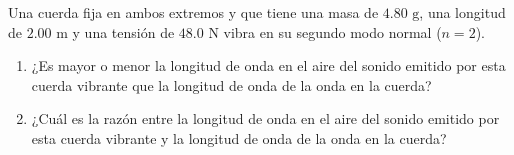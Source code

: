 \item Una cuerda fija en ambos extremos y que tiene una masa de $4.80\text{ g}$, una longitud de $2.00\text{ m}$ y una tensión de $48.0\text{ N}$ vibra en su segundo modo normal ($n = 2$).
\begin{enumerate}
    \item ¿Es mayor o menor la longitud de onda en el aire del sonido emitido por esta cuerda vibrante que la longitud de onda de la onda en la cuerda?
    \item ¿Cuál es la razón entre la longitud de onda en el aire del sonido emitido por esta cuerda vibrante y la longitud de onda de la onda en la cuerda?
\end{enumerate}